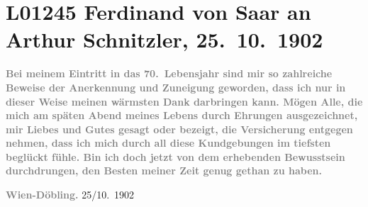 

\section[Ferdinand von Saar an Arthur Schnitzler, 25. 10. 1902]{L01245 Ferdinand von Saar an Arthur Schnitzler, 25. 10. 1902}
\nopagebreak{}
\rehead{ }\normalsize\beginnumbering{}
\toendnotes[C]{\smallbreak\pagebreak[2]}
\toendnotes[C]{\smallbreak}
\pstart
           \noindent{}\textcolor{gray}{\textbf{{\pb}Bei meinem Eintritt in das
                  70. Lebensjahr sind mir so zahlreiche Beweise der Anerkennung und Zuneigung
                  geworden, dass ich nur in dieser Weise meinen wärmsten Dank darbringen kann. Mögen
                  Alle, die mich am späten Abend meines Lebens durch Ehrungen ausgezeichnet, mir
                  Liebes und Gutes gesagt oder bezeigt, die Versicherung entgegen nehmen, dass ich
                  mich durch all diese Kundgebungen im tiefsten beglückt fühle. Bin ich doch jetzt
                  von dem erhebenden Bewusstsein durchdrungen, den Besten meiner Zeit genug gethan
                  zu haben.}}\pend
           
\pstart
           \textcolor{gray}{\textbf{Wien-Döbling.}}{ }25/10. 1902\pend
           
